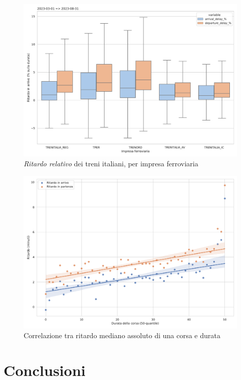 \documentclass[12pt,a4paper,italian]{report}
\begin{document}
\begin{figure}[h]
    \centering
    \includegraphics[width=1\textwidth]{images/delay_box_percentage_wd.pdf}
    \caption{\textit{Ritardo relativo} dei treni italiani, per impresa
        ferroviaria~\cite[J]{StatJup}}
    \label{figure:delay_box_percentage_wd}
\end{figure}

\begin{figure}
    \centering
    \includegraphics[width=1\textwidth]{images/delay_duration_corr.pdf}
    \caption{Correlazione tra ritardo mediano assoluto di una corsa e
        durata~\cite[K]{StatJup}}
    \label{figure:delay_duration_corr}
\end{figure}

\chapter{Conclusioni}
\end{document}
